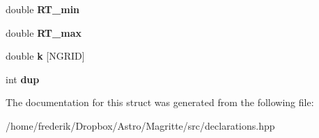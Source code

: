 \begin{DoxyCompactItemize}
\mbox{\label{structREACTION_a08e146548d3b9151158fee56bc1b6e5c}} 
double {\bfseries R\+T\+\_\+min}
\item 
\mbox{\label{structREACTION_ac882d0d2e896a2c6fa24ca14a1f138a6}} 
double {\bfseries R\+T\+\_\+max}
\item 
\mbox{\label{structREACTION_a6fe50c2df4c15db36b5ab622b33b8082}} 
double {\bfseries k} \mbox{[}N\+G\+R\+ID\mbox{]}
\item 
\mbox{\label{structREACTION_a92caff5e47eb5c4dc3a39c721e05da33}} 
int {\bfseries dup}
\end{DoxyCompactItemize}


The documentation for this struct was generated from the following file\+:\begin{DoxyCompactItemize}
\item 
/home/frederik/\+Dropbox/\+Astro/\+Magritte/src/declarations.\+hpp\end{DoxyCompactItemize}
